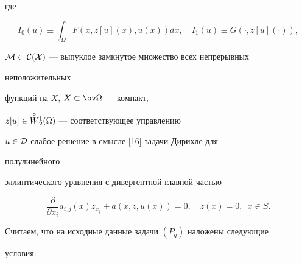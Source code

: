 где 


$$ 


I_0(u)\equiv\int_\Omega F(x,z[u](x),u(x))dx,\quad 


I_1(u)\equiv G(\cdot,z[u](\cdot)), 


$$ 


$\cal M\subset C(X)$ --- выпуклое замкнутое множество всех непрерывных 


неположительных 


функций на $X$, $X\subset\ov\Omega$ --- компакт, 


$z[u]\in\overset{\circ}{W}{}^1_2(\Omega)$ --- соответствующее управлению 


$u\in\cal D$ слабое решение в смысле [16] задачи Дирихле для 


полулинейного 


эллиптического уравнения с дивергентной главной частью 


\begin{equation} 


\frac{\partial}{\partial x_i}a_{i,j}(x)z_{x_j} 


+a(x,z,u(x))=0,\quad z(x)=0,\ \; x\in S. 


\end{equation} 


 


Считаем, что на исходные данные задачи $(P_q)$ наложены следующие 


условия: 


